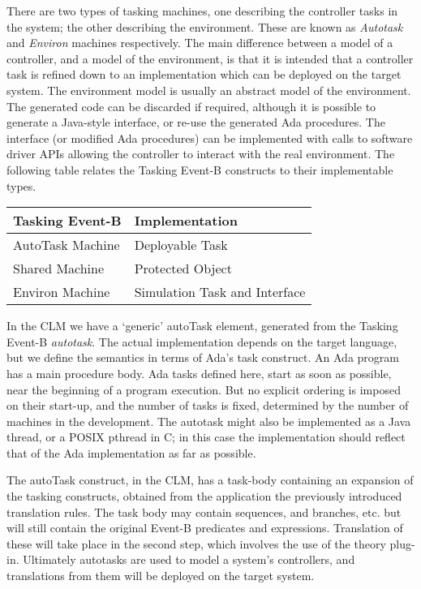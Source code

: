 There are two types of tasking machines, one describing the controller tasks in the system; the other describing the environment. These are known as \emph{Autotask} and \emph{Environ} machines respectively. The main difference between a model of a controller, and a model of the environment, is that it is intended that a controller task is refined down to an implementation which can be deployed on the target system. The environment model is usually an abstract model of the environment. The generated code can be discarded if required, although it is possible to generate a Java-style interface, or re-use the generated Ada procedures. The interface (or modified Ada procedures) can be implemented with calls to software driver APIs allowing the controller to interact with the real environment. The following table relates the Tasking Event-B constructs to their implementable types.
%
\begin{center}
\begin{tabular}{l|l}
Tasking Event-B & Implementation \\ 
\hline
AutoTask Machine & Deployable Task\\
Shared Machine &	Protected Object\\
Environ Machine &	Simulation Task and Interface
\end{tabular}
\end{center}
%
In the CLM we have a `generic' autoTask element, generated from the Tasking Event-B \emph{autotask}. The actual implementation depends on the target language, but we define the semantics in terms of Ada's task construct. An Ada program has a main procedure body. Ada tasks defined here, start as soon as possible, near the beginning of a program execution. But no explicit ordering is imposed on their start-up, and  the number of tasks is fixed, determined by the number of machines in the development. The autotask might also be implemented as a Java thread, or a POSIX pthread in C; in this case the implementation should reflect that of the Ada implementation as far as possible.

 The autoTask construct, in the CLM, has a task-body containing an expansion of the tasking constructs, obtained from the application the previously introduced translation rules. The task body may contain sequences, and branches, etc. but will still contain the original Event-B predicates and expressions. Translation of these will take place in the second step, which involves the use of the theory plug-in. Ultimately autotasks are used to model a system's controllers, and translations from them will be deployed on the target system.

